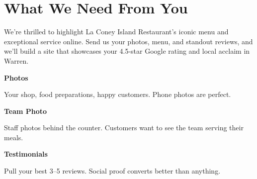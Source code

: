 \documentclass[11pt,letterpaper]{article}
\begin{document}
\vspace{0.2em}

\section*{What We Need From You}

We’re thrilled to highlight La Coney Island Restaurant’s iconic menu and exceptional service online. Send us your photos, menu, and standout reviews, and we’ll build a site that showcases your 4.5‑star Google rating and local acclaim in Warren.

\vspace{0.12em}

\noindent\begin{minipage}[t]{0.48\textwidth}
\begin{tcolorbox}[colframe=accent-teal, boxrule=1pt, left=0.7em, right=0.7em, top=0.5em, bottom=0.5em, arc=4pt, boxsep=0pt]
{\bfseries\small\color{accent-teal}Photos}

\vspace{0.15em}

{\small Your shop, food preparations, happy customers. Phone photos are perfect.}
\end{tcolorbox}

\vspace{0.1em}

\begin{tcolorbox}[colframe=accent-teal, boxrule=1pt, left=0.7em, right=0.7em, top=0.5em, bottom=0.5em, arc=4pt, boxsep=0pt]
{\bfseries\small\color{accent-teal}Team Photo}

\vspace{0.15em}

{\small Staff photos behind the counter. Customers want to see the team serving their meals.}
\end{tcolorbox}

\vspace{0.1em}

\begin{tcolorbox}[colframe=accent-teal, boxrule=1pt, left=0.7em, right=0.7em, top=0.5em, bottom=0.5em, arc=4pt, boxsep=0pt]
{\bfseries\small\color{accent-teal}Testimonials}

\vspace{0.15em}

{\small Pull your best 3--5 reviews. Social proof converts better than anything.}
\end{tcolorbox}
\end{minipage}
\hfill
\end{document}
